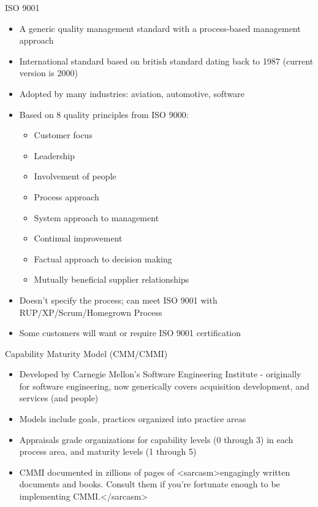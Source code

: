 \documentclass{beamer}
\begin{document}
\begin{frame}[fragile]{ISO 9001}


\begin{itemize}
\item A generic quality management standard with a process-based management approach
\item International standard based on british standard dating back to 1987 (current version is 2000)
\item Adopted by many industries: aviation, automotive, software
\item Based on 8 quality principles from ISO 9000:
\begin{itemize}
\item Customer focus
\item Leadership
\item Involvement of people
\item Process approach
\item System approach to management
\item Continual improvement
\item Factual approach to decision making
\item Mutually beneficial supplier relationships
\end{itemize}
\item Doesn't specify the process; can meet ISO 9001 with RUP/XP/Scrum/Homegrown Process
\item Some customers will want or require ISO 9001 certification
\end{itemize}


\end{frame}

\begin{frame}[fragile]{Capability Maturity Model (CMM/CMMI)}


\begin{itemize}
\item Developed by Carnegie Mellon's Software Engineering Institute - originally for software engineering, now generically covers acquisition development, and services (and people)
\item Models include goals, practices organized into practice areas
\item Appraisals grade organizations for capability levels (0 through 3) in each process area, and maturity levels (1 through 5)
\item CMMI documented in zillions of pages of <sarcasm>engagingly written documents and books.  Consult them if you're fortunate enough to be implementing CMMI.</sarcasm>
\end{itemize}


\end{frame}
\end{document}
